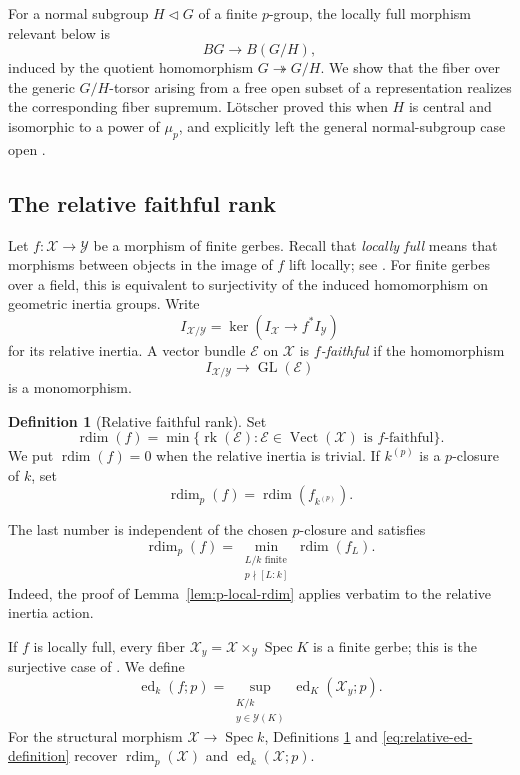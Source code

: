 \documentclass[11pt,reqno]{amsart}
\numberwithin{equation}{section}
\theoremstyle{plain}
\theoremstyle{definition}
\newtheorem{defi}[prop]{Definition}
\def\cX{{\mathcal X}}
\def\cE{{\mathcal E}}
\def\cY{{\mathcal Y}}
\def\rk{{\operatorname{rk}}}
\def\Spec{{\operatorname{Spec}}}
\def\ra{{\rightarrow}}
\def\GL{{\operatorname{GL}}}
\def\Vect{{\operatorname{Vect}}}
\def\rdim{{\operatorname{rdim}}}
\def\ed{{\operatorname{ed}}}
\begin{document}
For a normal subgroup $H\triangleleft G$ of a finite $p$-group, the
locally full morphism relevant below is
\[
BG\to B(G/H),
\]
induced by the quotient homomorphism $G\twoheadrightarrow G/H$.  We show
that the fiber over the generic $G/H$-torsor arising from a free open
subset of a representation realizes the corresponding fiber supremum.  L\"otscher proved this when $H$ is
central and isomorphic to a power of $\mu_p$, and explicitly left the
general normal-subgroup case open \cite[Remark~4.4]{LotscherFiber}.

\subsection{The relative faithful rank}

Let $f:\cX\to\cY$ be a morphism of finite gerbes.  Recall that
\emph{locally full} means that morphisms between objects in the image of
$f$ lift locally; see \cite[Definition~3.4]{BorneVistoliFundamental}.
For finite gerbes over a field, this is equivalent to surjectivity of the
induced homomorphism on geometric inertia groups.
Write
\[
I_{\cX/\cY}=\ker(I_{\cX}\ra f^*I_{\cY})
\]
for its relative inertia.  A vector bundle $\cE$ on $\cX$ is
\emph{$f$-faithful} if the homomorphism
\[
I_{\cX/\cY}\ra\GL(\cE)
\]
is a monomorphism.

\begin{defi}[Relative faithful rank]\label{def:relative-rank}
Set
\[
\rdim(f)=\min\{\rk(\cE):\cE\in\Vect(\cX)
                         \text{ is $f$-faithful}\}.
\]
We put $\rdim(f)=0$ when the relative inertia is trivial.  If
$k^{(p)}$ is a $p$-closure of $k$, set
\[
\rdim_p(f)=\rdim(f_{k^{(p)}}).
\]
\end{defi}

The last number is independent of the chosen $p$-closure and satisfies
\begin{equation}\label{eq:relative-p-local-minimum}
\rdim_p(f)=
\min_{\substack{L/k\text{ finite}\\p\nmid[L:k]}}\rdim(f_L).
\end{equation}
Indeed, the proof of Lemma~\ref{lem:p-local-rdim} applies verbatim to the
relative inertia action.

If $f$ is locally full, every fiber
$\cX_y=\cX\times_{\cY}\Spec K$ is a finite gerbe; this is the
surjective case of \cite[Lemma~3.3]{BorneVistoliFundamental}.  We define
\begin{equation}\label{eq:relative-ed-definition}
\ed_k(f;p)=
\sup_{\substack{K/k\\y\in\cY(K)}}\ed_K(\cX_y;p).
\end{equation}
For the structural morphism $\cX\to\Spec k$, Definitions
\ref{def:relative-rank} and \eqref{eq:relative-ed-definition} recover
$\rdim_p(\cX)$ and $\ed_k(\cX;p)$.
\end{document}
